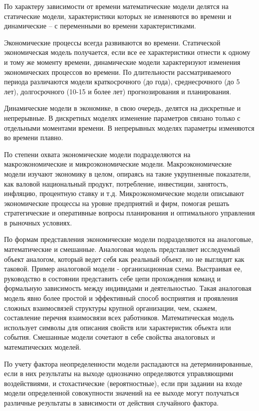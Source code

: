 По характеру зависимости от времени математические модели делятся на статические модели, характеристики которых не изменяются во времени и динамические – с переменными во времени характеристиками.


Экономические процессы всегда развиваются во времени. Статической экономическая модель получается, если все ее характеристики отнести к одному и тому же моменту времени, динамические модели характеризуют изменения экономических процессов во времени. По длительности рассматриваемого периода различаются модели краткосрочного (до года), среднесрочного (до 5 лет), долгосрочного (10-15 и более лет) прогнозирования и планирования.


Динамические модели в экономике, в свою очередь, делятся на дискретные и непрерывные. В дискретных моделях изменение параметров связано только с отдельными моментами времени. В непрерывных моделях параметры изменяются во времени плавно.


По степени охвата экономические модели подразделяются на макроэкономические и микроэкономические модели. Макроэкономические модели изучают экономику в целом, опираясь на такие укрупненные показатели, как валовой национальный продукт, потребление, инвестиции, занятость, инфляцию, процентную ставку и т.д. Микроэкономические модели описывают экономические процессы на уровне предприятий и фирм, помогая решать стратегические и оперативные вопросы планирования и оптимального управления в рыночных условиях.


По формам представления экономические модели подразделяются на аналоговые, математические и смешанные. Аналоговая модель представляет исследуемый объект аналогом, который ведет себя как реальный объект, но не выглядит как таковой. Пример аналоговой модели - организационная схема. Выстраивая ее, руководство в состоянии представить себе цепи прохождения команд и формальную зависимость между индивидами и деятельностью. Такая аналоговая модель явно более простой и эффективный способ восприятия и проявления сложных взаимосвязей структуры крупной организации, чем, скажем, составление перечня взаимосвязи всех работников. Математическая модель использует символы для описания свойств или характеристик объекта или события. Смешанные модели сочетают в себе свойства аналоговых и математических моделей.


По учету фактора неопределенности модели распадаются на детерминированные, если в них результаты на выходе однозначно определяются управляющими воздействиями, и стохастические (вероятностные), если при задании на входе модели определенной совокупности значений на ее выходе могут получаться различные результаты в зависимости от действия случайного фактора.


